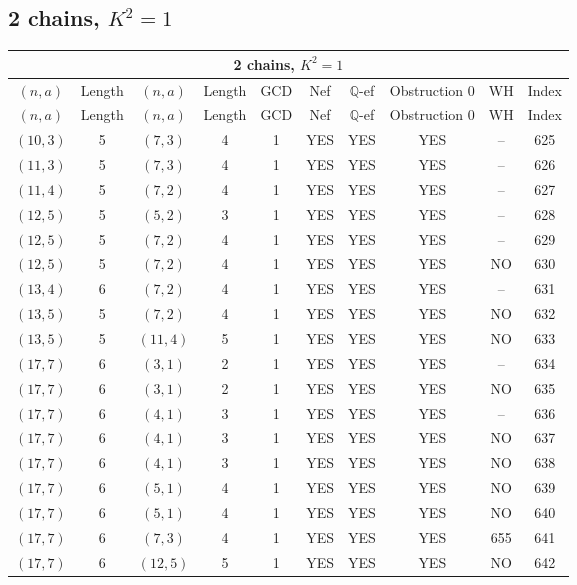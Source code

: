 \subsection{2 chains, $K^2 = 1$}
\begin{longtable}{|c|c|c|c|c|c|c|c|c|c|}
\hline
\multicolumn{10}{|c|}{2 chains, $K^2 = 1$}\\
\hline
$(n,a)$ & Length & $(n,a)$ & Length & GCD & Nef & $\mathbb Q$-ef & Obstruction 0 & WH & Index\\
\hline
\endfirsthead

\hline
$(n,a)$ & Length & $(n,a)$ & Length & GCD & Nef & $\mathbb Q$-ef & Obstruction 0 & WH & Index\\
\hline
\endhead
\hline
\endfoot

$(10, 3)$ & 5 & $(7, 3)$ & 4 & 1 & YES & YES & YES & -- & 625\\
$(11, 3)$ & 5 & $(7, 3)$ & 4 & 1 & YES & YES & YES & -- & 626\\
$(11, 4)$ & 5 & $(7, 2)$ & 4 & 1 & YES & YES & YES & -- & 627\\
$(12, 5)$ & 5 & $(5, 2)$ & 3 & 1 & YES & YES & YES & -- & 628\\
$(12, 5)$ & 5 & $(7, 2)$ & 4 & 1 & YES & YES & YES & -- & 629\\
$(12, 5)$ & 5 & $(7, 2)$ & 4 & 1 & YES & YES & YES & NO & 630\\
$(13, 4)$ & 6 & $(7, 2)$ & 4 & 1 & YES & YES & YES & -- & 631\\
$(13, 5)$ & 5 & $(7, 2)$ & 4 & 1 & YES & YES & YES & NO & 632\\
$(13, 5)$ & 5 & $(11, 4)$ & 5 & 1 & YES & YES & YES & NO & 633\\
$(17, 7)$ & 6 & $(3, 1)$ & 2 & 1 & YES & YES & YES & -- & 634\\
$(17, 7)$ & 6 & $(3, 1)$ & 2 & 1 & YES & YES & YES & NO & 635\\
$(17, 7)$ & 6 & $(4, 1)$ & 3 & 1 & YES & YES & YES & -- & 636\\
$(17, 7)$ & 6 & $(4, 1)$ & 3 & 1 & YES & YES & YES & NO & 637\\
$(17, 7)$ & 6 & $(4, 1)$ & 3 & 1 & YES & YES & YES & NO & 638\\
$(17, 7)$ & 6 & $(5, 1)$ & 4 & 1 & YES & YES & YES & NO & 639\\
$(17, 7)$ & 6 & $(5, 1)$ & 4 & 1 & YES & YES & YES & NO & 640\\
$(17, 7)$ & 6 & $(7, 3)$ & 4 & 1 & YES & YES & YES & 655 & 641\\
$(17, 7)$ & 6 & $(12, 5)$ & 5 & 1 & YES & YES & YES & NO & 642\\

\end{longtable}
